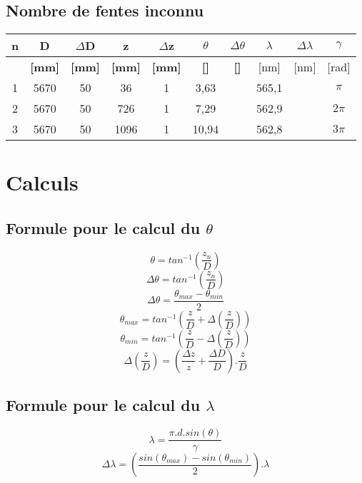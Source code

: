 \documentclass[11pt,a4paper]{report}
\begin{document}
	\subsection{Nombre de fentes inconnu}
	\begin{tabular}{|c|c|c|c|c|c|c|c|c|c|}
		\hline
		\bf n & \bf D & \bf $\Delta$D & \bf z & \bf $\Delta$z & \bf $\theta$ & \bf $\Delta \theta$ & $\lambda$& $\Delta \lambda$&\bf $\gamma$ \\
		\hline
		 & \bf [mm] & \bf [mm] & \bf [mm] & \bf [mm] & \bf [\degre]  & \bf [\degre]  &  [nm] & [nm] & [rad]\\
		\hline
		1 & 5670 & 50 & 36 &   1&3,63&  &565,1& &$\pi$\\
		2 & 5670 & 50 & 726 &  1&7,29&  &562,9& &$2\pi$\\
		3 & 5670 & 50 & 1096 &  1&10,94&  &562,8& &$3\pi$\\
		\hline
	\end{tabular}
	\section{Calculs}
	\subsection{Formule pour le calcul du $\theta$}
	\begin{equation}
	\theta = tan^{-1}\left(\frac{z_{n}}{D}\right) 
	\end{equation}
	\begin{equation}
	\Delta \theta = tan^{-1}\left(\frac{z_{n}}{D}\right) 
	\end{equation}
	\begin{equation}
\Delta\theta=\frac{\theta_{max}-\theta_{min}}{2}
	\end{equation}
	\begin{equation}
	\theta_{max} = tan^{-1}\left(\frac{z}{D}+\Delta\left(\frac{z}{D}\right)\right)
	\end{equation}
	\begin{equation}
	\theta_{min} = tan^{-1}\left(\frac{z}{D}-\Delta\left(\frac{z}{D}\right)\right)
	\end{equation}
	\begin{equation}
	\Delta\left(\frac{z}{D}\right)=\left(\frac{\Delta z}{z}+\frac{\Delta D}{D}\right).\frac{z}{D}
	\end{equation}
	\subsection{Formule pour le calcul du $\lambda$}
	\begin{equation}
	\lambda = \frac{\pi.d.sin(\theta)}{\gamma}
	\end{equation}
	\begin{equation}
	\Delta \lambda = \left(\frac{sin(\theta_{max})-sin(\theta_{min})}{2}\right) . \lambda
	\end{equation}
\end{document}
